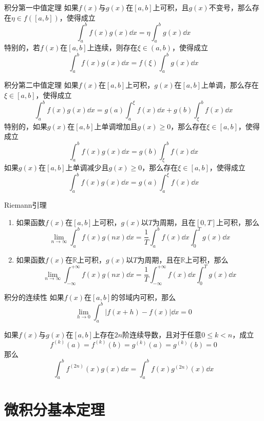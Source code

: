 \documentclass[lang = cn, scheme = chinese, thmcnt = section]{elegantbook}
\newcommand{\R}{\mathbb{R}}            %
\begin{document}
\begin{theorem}{积分第一中值定理}
	如果$f(x)$与$g(x)$在$[a,b]$上可积，且$g(x)$不变号，那么存在$\displaystyle \eta\in f([a,b])$，使得成立
	$$
	\int_{a}^{b}f(x)g(x)\dd x
	=\eta\int_{a}^{b}g(x)\dd x
	$$
	特别的，若$f(x)$在$[a,b]$上连续，则存在$\xi\in(a,b)$，使得成立
	$$
	\int_{a}^{b}f(x)g(x)\dd x
	=f(\xi)\int_{a}^{b}g(x)\dd x
	$$
\end{theorem}

\begin{theorem}{积分第二中值定理}
	如果$f(x)$在$[a,b]$上可积，$g(x)$在$[a,b]$上单调，那么存在$\xi\in[a,b]$，使得成立
	$$
	\int_{a}^{b}f(x)g(x)\dd x
	=g(a)\int_{a}^{\xi}f(x)\dd x+g(b)\int_{\xi}^{b}f(x)\dd x
	$$
	特别的，如果$g(x)$在$[a,b]$上单调增加且$g(x)\ge 0$，那么存在$\xi\in[a,b]$，使得成立
	$$
	\int_{a}^{b}f(x)g(x)\dd x
	=g(b)\int_{\xi}^{b}f(x)\dd x
	$$
	如果$g(x)$在$[a,b]$上单调减少且$g(x)\ge 0$，那么存在$\xi\in[a,b]$，使得成立
	$$
	\int_{a}^{b}f(x)g(x)\dd x
	=g(a)\int_{a}^{\xi}f(x)\dd x
	$$
\end{theorem}

\begin{theorem}{Riemann引理}
	\begin{enumerate}
		\item 如果函数$f(x)$在$[a,b]$上可积，$g(x)$以$T$为周期，且在$[0,T]$上可积，那么
		$$
		\lim_{n\to\infty}\int_{a}^{b}f(x)g(nx)\dd x
		=\frac{1}{T}\int_{a}^{b}f(x)\dd x\int_{0}^{T}g(x)\dd x
		$$
		\item 如果函数$f(x)$在$\R$上可积，$g(x)$以$T$为周期，且在$\R$上可积，那么
		$$
		\lim_{n\to\infty}\int_{-\infty}^{+\infty}f(x)g(nx)\dd x
		=\frac{1}{T}\int_{-\infty}^{+\infty}f(x)\dd x\int_{0}^{T}g(x)\dd x
		$$
	\end{enumerate}
\end{theorem}

\begin{theorem}{积分的连续性}
	如果$f(x)$在$[a,b]$的邻域内可积，那么%
	$$
	\lim_{h\to 0}\int_{a}^{b}|f(x+h)-f(x)|\dd x=0
	$$
\end{theorem}

\begin{proposition}
	如果$f(x)$与$g(x)$在$[a,b]$上存在$2n$阶连续导数，且对于任意$0\le k <n$，成立
	$$
	f^{(k)}(a)=f^{(k)}(b)=g^{(k)}(a)=g^{(k)}(b)=0
	$$
	那么
	$$
	\int_{a}^{b}f^{(2n)}(x)g(x)\dd x
	=\int_{a}^{b}f(x)g^{(2n)}(x)\dd x
	$$
\end{proposition}

\section{微积分基本定理}
\end{document}
